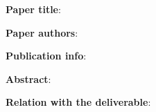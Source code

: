 
\item
\begin{list}{\quad}{}
\item \textbf{Paper title}: 
\item \textbf{Paper authors}: 
\item\textbf{Publication info}: 
\item\textbf{Abstract}:
\item \textbf{Relation with the deliverable}: 
\end{list}
